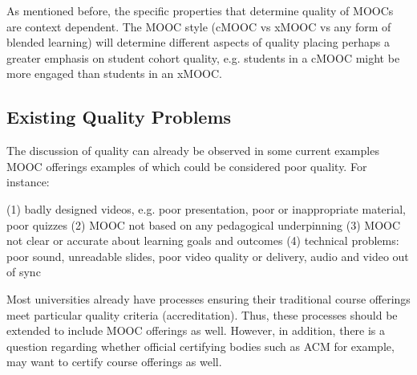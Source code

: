 As mentioned before, the specific properties that determine quality of
MOOCs are context dependent. The MOOC style (cMOOC vs xMOOC vs any form
of blended learning) will determine different aspects of quality placing
perhaps a greater emphasis on student cohort quality, e.g. students in a
cMOOC might be more engaged than students in an xMOOC.


\subsection{Existing Quality Problems}

The discussion of quality can already be observed in some current
examples MOOC offerings examples of which could be considered poor
quality. For instance:

(1) badly designed videos, e.g. poor presentation, poor or inappropriate
material, poor quizzes (2) MOOC not based on any pedagogical
underpinning (3) MOOC not clear or accurate about learning goals and
outcomes (4) technical problems: poor sound, unreadable slides, poor
video quality or delivery, audio and video out of sync


Most universities already have processes ensuring their traditional
course offerings meet particular quality criteria (accreditation). Thus,
these processes should be extended to include MOOC offerings as
well. However, in addition, there is a question regarding whether
official certifying bodies such as ACM for example, may want to certify
course offerings as well.

